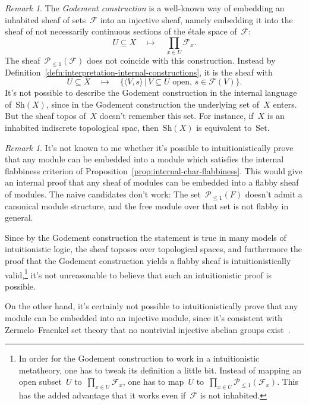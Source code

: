 \documentclass[10pt,reqno,a4paper]{amsbook}
\theoremstyle{definition}
\theoremstyle{plain}
\theoremstyle{remark}
\newtheorem{rem}[defn]{Remark}
\newcommand{\F}{\mathcal{F}}
\renewcommand{\P}{\mathcal{P}}
\newcommand{\Set}{\mathrm{Set}}
\newcommand{\Sh}{\mathrm{Sh}}
\newcommand{\?}{\,{:}\,}
\renewcommand{\_}{\mathpunct{.}\,}
\begin{document}
\begin{rem}The \emph{Godement construction} is a well-known way of embedding an
inhabited sheaf of sets~$\F$ into an injective sheaf, namely embedding it into
the sheaf of not necessarily continuous sections of the étale space of~$\F$:
\[ U \subseteq X \quad\longmapsto\quad
  \prod_{x \in U} \F_x. \]
The sheaf~$\P_{\leq1}(\F)$ does not coincide with this construction.
Instead by Definition~\ref{defn:interpretation-internal-constructions}, it is the sheaf with
\[ U \subseteq X \quad\longmapsto\quad
  \{ \langle V, s \rangle \,|\,
    \text{$V \subseteq U$ open, $s \in \F(V)$} \}. \]
It's not possible to describe the Godement construction in the internal language
of~$\Sh(X)$, since in the Godement construction the underlying set of~$X$
enters. But the sheaf topos of~$X$ doesn't remember this set. For instance, if~$X$
is an inhabited indiscrete topological spac, then~$\Sh(X)$ is equivalent
to~$\Set$.
\end{rem}

\begin{rem}It's not known to me whether it's possible to intuitionistically
prove that any module can be embedded into a module which satisfies the internal
flabbiness criterion of Proposition~\ref{prop:internal-char-flabbiness}. This
would give an internal proof that any sheaf of modules can be embedded into a
flabby sheaf of modules. The naive candidates don't work: The
set~$\P_{\leq1}(F)$ doesn't admit a canonical module structure, and the free
module over that set is not flabby in general.

Since by the Godement construction the statement is true in many models of
intuitionistic logic, the sheaf toposes over topological spaces, and
furthermore the proof that the Godement construction yields a flabby sheaf is
intuitionistically valid,\footnote{In order for the Godement construction to
work in a intuitionistic metatheory, one has to tweak its definition a little
bit.  Instead of mapping an open subset~$U$ to~$\prod_{x \in U} \F_x$, one has
to map~$U$ to~$\prod_{x \in U} \P_{\leq1}(\F_x)$. This has the added advantage
that it works even if~$\F$ is not inhabited.} it's not unreasonable to believe
that such an intuitionistic proof is possible.

On the other hand, it's certainly not possible to intuitionistically prove that
any module can be embedded into an injective module, since it's consistent with
Zermelo--Fraenkel set theory that no nontrivial injective abelian groups
exist~\cite{blass:inj-proj-axc}.
\end{rem}
\end{document}
